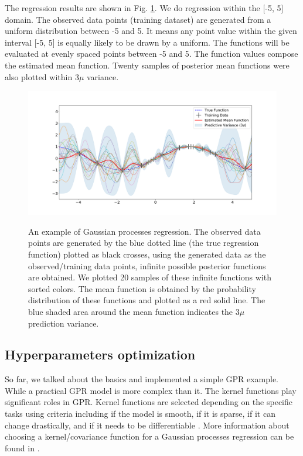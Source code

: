 \documentclass[12pt,letterpaper,fleqn,oneside,titlepage]{offroad-report}
\begin{document}
The regression results are shown in Fig. \ref{FIG:10}. We do regression within the [-5, 5] domain. The observed data points (training dataset) are generated from a uniform distribution between -5 and 5. It means any point value within the given interval [-5, 5] is equally likely to be drawn by a uniform. The functions will be evaluated at evenly spaced points between -5 and 5. The function values compose the estimated mean function. Twenty samples of posterior mean functions were also plotted within $3\mu$ variance.
\begin{figure}[h!]
	\centering
		{{\includegraphics[trim=4.5cm 1.6cm 4.4cm 0.6cm, width=15cm]{figs/illustrative_posterior_func.pdf}}}
	\caption{An example of Gaussian processes regression. The observed data points are generated by the blue dotted line (the true regression function) plotted as black crosses, using the generated data as the observed/training data points, infinite possible posterior functions are obtained. We plotted 20 samples of these infinite functions with sorted colors. The mean function is obtained by the probability distribution of these functions and plotted as a red solid line. The blue shaded area around the mean function indicates the $3\mu$ prediction variance.}
	\label{FIG:10}
\end{figure}

\subsection{Hyperparameters optimization}\label{Hyperparameters}
So far, we talked about the basics and implemented a simple GPR example. While a practical GPR model is more complex than it. The kernel functions play significant roles in GPR. Kernel functions are selected depending on the specific tasks using criteria including if the model is smooth, if it is sparse, if it can change drastically, and if it needs to be differentiable \cite{duvenaud2014automatic}. More information about choosing a kernel/covariance function for a Gaussian processes regression can be found in \cite{duvenaud2014automatic}. 
\end{document}
